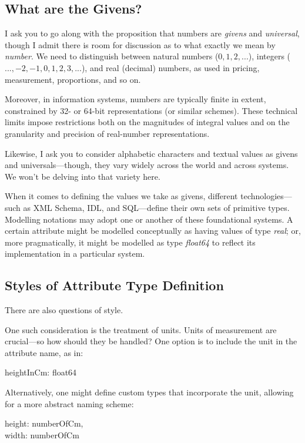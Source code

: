 \subsection{What are the Givens?}

I ask you to go along with the proposition that numbers are \textit{givens} and \textit{universal}, though I admit there is room for discussion as to what exactly we mean by \textit{number}. We need to distinguish between natural numbers ($0,1,2,...$), integers ($...,-2,-1,0,1,2,3,...$), and real (decimal) numbers, as used in pricing, measurement, proportions, and so on. 

Moreover, in information systems, numbers are typically finite in extent, constrained by 32- or 64-bit representations (or similar schemes). These technical limits impose restrictions both on the magnitudes of integral values and on the granularity and precision of real-number representations.

Likewise, I ask you to consider alphabetic characters and textual values as givens and universals—though,  they vary widely across the world and across systems. We won’t be delving into that variety here.

When it comes to defining the values we take as givens, different technologies—such as XML Schema, IDL, and SQL—define their own sets of primitive types. Modelling notations may adopt one or another of these foundational systems. A certain attribute might be modelled conceptually as having values of type \textit{real}; or, more pragmatically, it might be modelled as type \textit{float64} to reflect its implementation in a particular system.


\subsection{Styles of Attribute Type Definition}

There are also questions of style.

One such consideration is the treatment of units. Units of measurement are crucial—so how should they be handled? One option is to include the unit in the attribute name, as in:

\begin{erquote}
heightInCm: float64
\end{erquote}

Alternatively, one might define custom types that incorporate the unit, allowing for a more abstract naming scheme:

\begin{erquote}
height: numberOfCm,\\
width: numberOfCm
\end{erquote}

